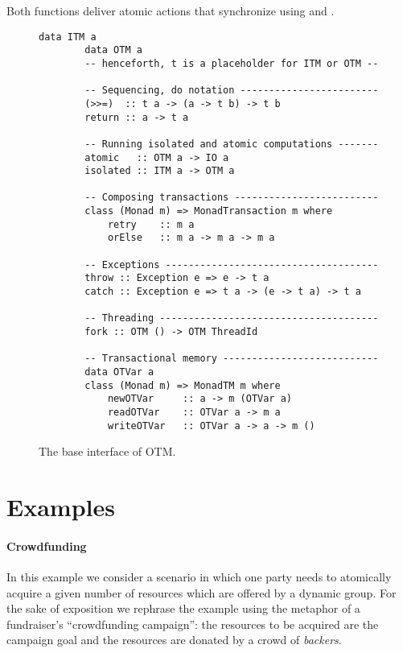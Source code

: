 Both functions deliver atomic actions that synchronize using
 and . 

\begin{figure}
    \centering
    \begin{Verbatim}[tabsize=3, gobble=2]
        data ITM a
        data OTM a
        -- henceforth, t is a placeholder for ITM or OTM --
        
        -- Sequencing, do notation ------------------------
        (>>=)  :: t a -> (a -> t b) -> t b
        return :: a -> t a
        
        -- Running isolated and atomic computations -------
        atomic   :: OTM a -> IO a
        isolated :: ITM a -> OTM a
        
        -- Composing transactions -------------------------
        class (Monad m) => MonadTransaction m where
            retry    :: m a
            orElse   :: m a -> m a -> m a
        
        -- Exceptions -------------------------------------
        throw :: Exception e => e -> t a
        catch :: Exception e => t a -> (e -> t a) -> t a
        
        -- Threading --------------------------------------
        fork :: OTM () -> OTM ThreadId
        
        -- Transactional memory ---------------------------
        data OTVar a
        class (Monad m) => MonadTM m where
            newOTVar     :: a -> m (OTVar a)
            readOTVar    :: OTVar a -> m a
            writeOTVar   :: OTVar a -> a -> m ()

    \end{Verbatim}
    \caption{The base interface of OTM.}
    \label{fig:base-interface}
\end{figure}

\section{Examples}
\paragraph{Crowdfunding}
In this example we consider a scenario in which
one party needs to atomically acquire a given number 
of resources which are offered by a dynamic group.
For the sake of exposition we rephrase the example
using the metaphor of a fundraiser's ``crowdfunding campaign'': 
the resources to be acquired are the campaign goal
and the resources are donated by a crowd of \emph{backers}.

